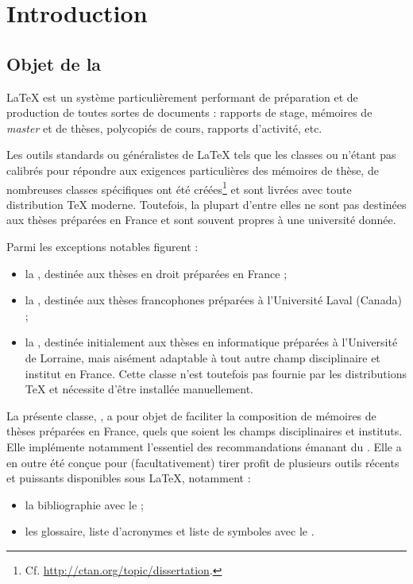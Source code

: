 \chapter{Introduction}

\section{Objet de la \yatcl}
\label{sec:objet-de-la}

\LaTeX{} est un système particulièrement performant de préparation et de
production de toutes sortes de documents : rapports de stage, mémoires de
\emph{master} et de thèses, polycopiés de cours, rapports d'activité, etc.

Les outils standards ou généralistes de \LaTeX{} tels que les classes
 ou  n'étant pas calibrés pour répondre aux exigences
particulières des mémoires de thèse, de nombreuses classes spécifiques ont été
créées\footnote{Cf. \url{http://ctan.org/topic/dissertation}.}  et sont livrées
avec toute distribution \TeX{} moderne. Toutefois, la plupart d'entre elles ne
sont pas destinées aux thèses préparées en France et sont souvent propres à une
université donnée.

Parmi les exceptions notables figurent :
\begin{itemize}
\item la , destinée aux thèses en droit
  préparées en France ;
\item la , destinée aux thèses francophones
  préparées à l'Université Laval (Canada) ;
\item la , destinée initialement aux thèses en
  informatique préparées à l'Université de Lorraine, mais aisément adaptable
  à tout autre champ disciplinaire et institut en France. Cette classe n'est
  toutefois pas fournie par les distributions \TeX{} et nécessite d'être
  installée manuellement.
\end{itemize}

La présente classe, \yat, a pour objet de faciliter la composition de mémoires
de thèses préparées en France, quels que soient les champs disciplinaires et
instituts. Elle implémente notamment  l'essentiel des recommandations émanant du
\citeauthor{guidoct} \autocite{guidoct}.  Elle a en outre été conçue pour
(facultativement) tirer profit de plusieurs outils récents et puissants
disponibles sous \LaTeX{}, notamment :
\begin{itemize}
\item la bibliographie avec le  ;
\item les glossaire, liste d'acronymes et liste de symboles avec le
  .
\end{itemize}

